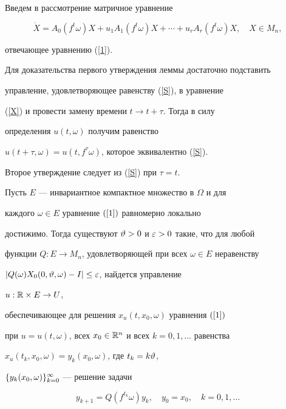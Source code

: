\begin{pf} Введем в рассмотрение матричное уравнение


\begin{equation}


\label{X}


\Dot X=A_0(f^t\omega)X+u_1A_1(f^t\omega)X+\dotsb


+u_r A_r(f^t\omega)X,\quad X\in M_n,


\end{equation}


отвечающее уравнению (\ref{1}).


Для доказательства первого утверждения леммы достаточно подставить


управление, удовлетворяющее равенству (\ref{S}), в уравнение


(\ref{X}) и провести замену времени $t\to t+\tau$. Тогда в силу


определения $u(t,\omega)$ получим равенство


$u(t+\tau,\omega)=u(t,f^{\tau}\omega)$, которое эквивалентно (\ref{S}).





Второе утверждение следует из (\ref{S}) при $\tau=t$.


\end{pf}





\begin{thm}


\label{th1}


Пусть $E$ --- инвариантное компактное множество в $\Omega$ и для


каждого $\omega\in E$  уравнение $(\ref{1})$ равномерно локально


достижимо. Тогда существуют $\vartheta>0$ и $\varepsilon>0$ такие, что для любой


функции $Q:E\to M_n$, удовлетворяющей при всех $\omega\in E$ неравенству


$|Q(\omega)X_0(0,\vartheta,\omega)-I|\le\varepsilon$, найдется управление


$u:\Bbb R\times E\to U$,


обеспечивающее для решения $x_u(t,x_0,\omega)$ уравнения $(\ref{1})$


при $u=u(t,\omega)$, всех $x_0\in\Bbb R^n$ и всех $k=0,1,\dotsc$ равенства


$x_u(t_k,x_0,\omega)=y_k(x_0,\omega)$, где $t_k=k\vartheta$,


$\{y_k(x_0,\omega)\}_{k=0}^{\infty}$ --- решение задачи


\begin{equation}


\label{Q}


y_{k+1}=Q(f^{t_k}\omega)y_k,\quad y_0=x_0,\quad k=0,1,\dotsc


\end{equation}


\end{thm}





